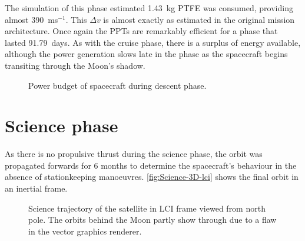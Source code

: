 The simulation of this phase estimated 1.43~kg PTFE was consumed, providing almost 390~ms$^{-1}$. This $\Delta v$ is almost exactly as estimated in the original mission architecture. Once again the PPTs are remarkably efficient for a phase that lasted 91.79~days. As with the cruise phase, there is a surplus of energy available, although the power generation slows late in the phase as the spacecraft begins transiting through the Moon's shadow.

\begin{figure}
\centering
\def\svgwidth{\figurewidth}

\caption{Power budget of spacecraft during descent phase.} \label{fig:Descent-power}
\end{figure}


\clearpage


\section{Science phase} \label{sec:Science}

As there is no propulsive thrust during the science phase, the orbit was propagated forwards for 6 months to determine the spacecraft's behaviour in the absence of stationkeeping manoeuvres. \autoref{fig:Science-3D-lci} shows the final orbit in an inertial frame. %

\begin{figure}[h]
\centering
\def\svgwidth{\figurewidth}

\caption{Science trajectory of the satellite in LCI frame viewed from north pole. The orbits behind the Moon partly show through due to a flaw in the vector graphics renderer.} \label{fig:Science-3D-lci}
\end{figure}

%

